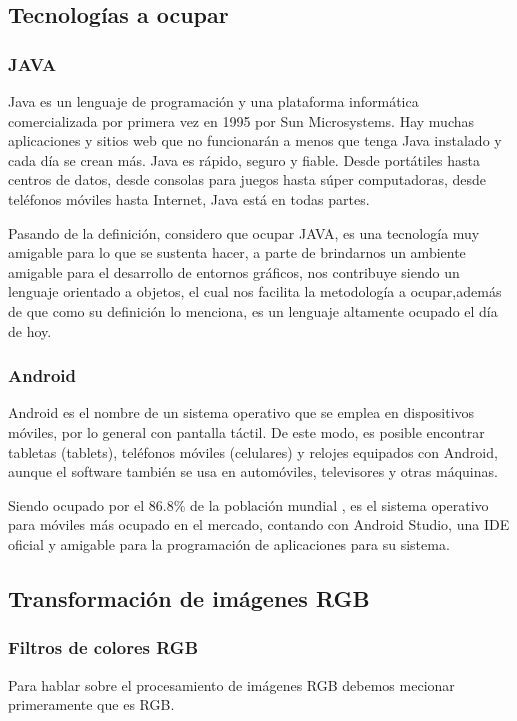 \documentclass[10pt]{article}
\begin{document}
\subsection{Tecnologías a ocupar}
\subsubsection{JAVA}
Java es un lenguaje de programación y una plataforma informática comercializada por primera vez en 1995 por Sun Microsystems. Hay muchas aplicaciones y sitios web que no funcionarán a menos que tenga Java instalado y cada día se crean más. Java es rápido, seguro y fiable. Desde portátiles hasta centros de datos, desde consolas para juegos hasta súper computadoras, desde teléfonos móviles hasta Internet, Java está en todas partes\cite{IEEEreferencias:Ref40}.

Pasando de la definición, considero que ocupar JAVA, es una tecnología muy amigable para lo que se sustenta hacer, a parte de brindarnos un ambiente amigable para el desarrollo de entornos gráficos, nos contribuye siendo un lenguaje orientado a objetos, el cual nos facilita la metodología a ocupar,además de que como su definición lo menciona, es un lenguaje altamente ocupado el día de hoy.
\subsubsection{Android}
Android es el nombre de un sistema operativo que se emplea en dispositivos móviles, por lo general con pantalla táctil. De este modo, es posible encontrar tabletas (tablets), teléfonos móviles (celulares) y relojes equipados con Android, aunque el software también se usa en automóviles, televisores y otras máquinas\cite{IEEEreferencias:Ref41}.

Siendo ocupado por el 86.8\% de la población mundial \cite{IEEEreferencias:Ref42}, es el sistema operativo para móviles más ocupado en el mercado, contando con Android Studio, una IDE oficial y amigable para la programación de aplicaciones para su sistema.

\subsection{Transformación de imágenes RGB}
\subsubsection{Filtros de colores RGB}

Para hablar sobre el procesamiento de imágenes RGB debemos mecionar primeramente que es RGB.
\end{document}
